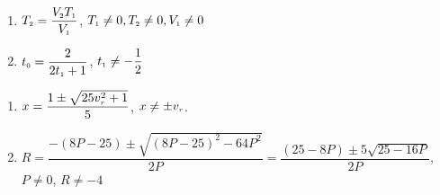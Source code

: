 \documentclass[11pt]{article}
\theoremstyle{definition}  %
\newcounter{HW}
\begin{document}
\begin{multicols}{2}
\begin{enumerate}
\setcounter{enumi}{\value{HW}}

\item $T_{\text{\tiny $2$}} = \dfrac{V_{\text{\tiny $2$}}T_{\text{\tiny $1$}}}{V_{\text{\tiny $1$}}}$, $T_{\text{\tiny $1$}} \neq 0, T_{\text{\tiny $2$}} \neq 0, V_{\text{\tiny $1$}} \neq 0$


\item  $t_{\text{\tiny $0$}} = \dfrac{2}{2t_{\text{\tiny $1$}} + 1}$, $t_{\text{\tiny $1$}} \neq -\dfrac{1}{2}$

\setcounter{HW}{\value{enumi}}
\end{enumerate}
\end{multicols}

\begin{enumerate}
\setcounter{enumi}{\value{HW}}


\item  $x = \dfrac{1 \pm \sqrt{25v_{\text{\tiny $r$}}^2+1}}{5}$, $x \neq \pm v_{\text{\tiny $r$}}$.

\item $R= \dfrac{-(8P-25) \pm \sqrt{(8P-25)^2 - 64P^2}}{2P} = \dfrac{(25-8P) \pm 5 \sqrt{25-16P}}{2P}$, $P \neq 0$, $R \neq -4$

\setcounter{HW}{\value{enumi}}
\end{enumerate}
\end{document}
